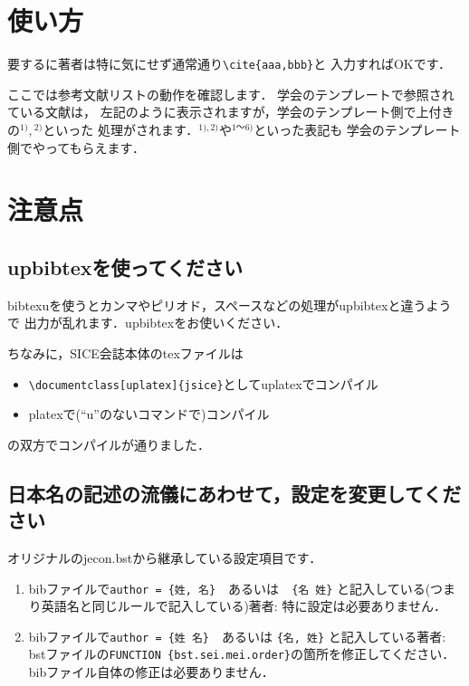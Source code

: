 \documentclass[a4j,fleqn,dvipdfmx,twocolumn]{jsarticle}
\begin{document}
\section{使い方}
要するに著者は特に気にせず通常通り\verb+\cite{aaa,bbb}+と
入力すればOKです．

ここでは参考文献リストの動作を確認します．
学会のテンプレートで参照されている文献\cite{1,2,3,4,5,6}は，
左記のように表示されますが，学会のテンプレート側で上付きの${}^{1)}, {}^{2)}$といった
処理がされます．${}^{1),2)}$や${}^{1\text{～}6)}$といった表記も
学会のテンプレート側でやってもらえます．

\section{注意点}
\subsection{upbibtexを使ってください}
bibtexuを使うとカンマやピリオド，スペースなどの処理がupbibtexと違うようで
出力が乱れます．upbibtexをお使いください．

ちなみに，SICE会誌本体のtexファイルは
\begin{itemize}
	\item \verb+\documentclass[uplatex]{jsice}+としてuplatexでコンパイル
	\item platexで(``u''のないコマンドで)コンパイル
\end{itemize}
の双方でコンパイルが通りました．

\subsection{日本名の記述の流儀にあわせて，設定を変更してください}
オリジナルのjecon.bstから継承している設定項目です．
\begin{enumerate}
	\item bibファイルで\verb+author = {姓, 名}+　あるいは　\verb+{名 姓}+
	      と記入している(つまり英語名と同じルールで記入している)著者:
	      特に設定は必要ありません．
	\item bibファイルで\verb+author = {姓 名}+　あるいは \verb+{名, 姓}+
	      と記入している著者:
	      bstファイルの\verb+FUNCTION {bst.sei.mei.order}+の箇所を修正してください．
	      bibファイル自体の修正は必要ありません．
\end{enumerate}
\end{document}
